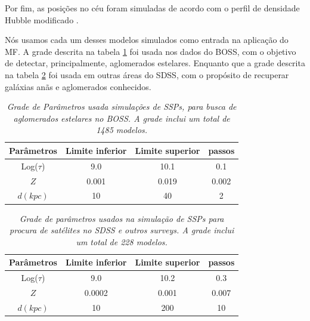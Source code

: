 \documentclass[
	12pt,				%
	openany,			%
	oneside,			%
	a4paper,			%
	english,			%
	brazil				%
	]{abntex2}
\begin{document}
Por fim, as posições no céu foram simuladas  de acordo com o perfil de densidade Hubble modificado \cite{1972ApJ...175..627R}. \par

Nós usamos cada um desses modelos simulados como entrada na aplicação do MF. A grade descrita na tabela \ref{tab:1} foi usada nos dados do BOSS, com o objetivo de detectar, principalmente, aglomerados estelares. Enquanto que a grade descrita na tabela \ref{tab:2} foi usada em outras áreas do SDSS, com o propósito de recuperar galáxias anãs e aglomerados conhecidos.

\begin{table}[h]
\caption{\emph{Grade de Parâmetros usada simulações de SSPs, para busca de aglomerados estelares no BOSS. A grade inclui um total de 1485 modelos.}} 
\centering
\begin{tabular}{cccc}
\hline
Parâmetros & Limite inferior & Limite superior & passos \\
\hline
\hline
Log($\tau$) & 9.0 & 10.1 & 0.1 \\
$Z$ & 0.001 & 0.019 & 0.002 \\
$d (kpc)$ & 10 & 40 & 2 \\
\hline
\end{tabular}
\label{tab:1}
\end{table}


\begin{table}[h]
\caption{\emph{ Grade de parâmetros usados na simulação de SSPs para procura de satélites no SDSS e outros surveys. A grade inclui um total de 228 modelos.}}
\centering
\begin{tabular}{cccc}
\hline
Parâmetros & Limite inferior & Limite superior & passos \\
\hline
\hline
Log($\tau$) & 9.0 & 10.2 & 0.3 \\
$Z$ & 0.0002 & 0.001 & 0.007 \\
$d (kpc)$ & 10 & 200 & 10 \\
\hline
\end{tabular}
\label{tab:2}
\end{table}
\end{document}
